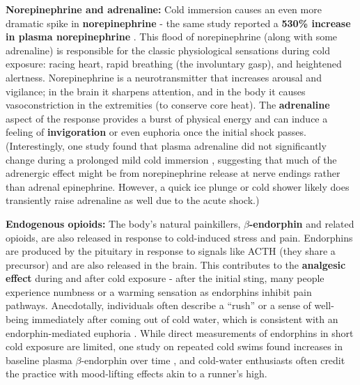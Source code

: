 \documentclass[11pt]{article}
\newcommand{\quotes}[1]{``#1''}
\begin{document}
\textbf{Norepinephrine and adrenaline:} Cold immersion causes an even more dramatic spike in \textbf{norepinephrine} - the same study reported a \textbf{530\% increase in plasma norepinephrine} \cite{Sramek2000}. This flood of norepinephrine (along with some adrenaline) is responsible for the classic physiological sensations during cold exposure: racing heart, rapid breathing (the involuntary gasp), and heightened alertness. Norepinephrine is a neurotransmitter that increases arousal and vigilance; in the brain it sharpens attention, and in the body it causes vasoconstriction in the extremities (to conserve core heat). The \textbf{adrenaline} aspect of the response provides a burst of physical energy and can induce a feeling of \textbf{invigoration} or even euphoria once the initial shock passes. (Interestingly, one study found that plasma adrenaline did not significantly change during a prolonged mild cold immersion \cite{Sramek2000}, suggesting that much of the adrenergic effect might be from norepinephrine release at nerve endings rather than adrenal epinephrine. However, a quick ice plunge or cold shower likely does transiently raise adrenaline as well due to the acute shock.)

\textbf{Endogenous opioids:} The body's natural painkillers, \textbf{$\beta$-endorphin} and related opioids, are also released in response to cold-induced stress and pain. Endorphins are produced by the pituitary in response to signals like ACTH (they share a precursor) and are also released in the brain. This contributes to the \textbf{analgesic effect} during and after cold exposure - after the initial sting, many people experience numbness or a warming sensation as endorphins inhibit pain pathways. Anecdotally, individuals often describe a \quotes{rush} or a sense of well-being immediately after coming out of cold water, which is consistent with an endorphin-mediated euphoria \cite{pbsBathsSocial}. While direct measurements of endorphins in short cold exposure are limited, one study on repeated cold swims found increases in baseline plasma $\beta$-endorphin over time \cite{stanfordJumpingInto}, and cold-water enthusiasts often credit the practice with mood-lifting effects akin to a runner's high.
\end{document}
